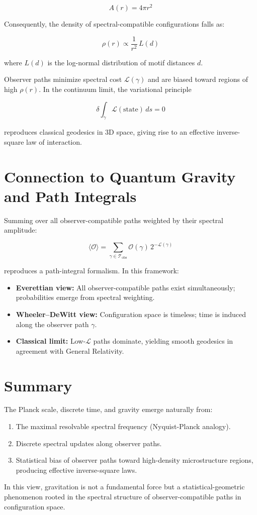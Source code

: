 \documentclass[11pt]{article}
\begin{document}
\[
A(r) = 4 \pi r^2
\]

Consequently, the density of spectral-compatible configurations falls as:

\[
\rho(r) \propto \frac{1}{r^2} \, L(d)
\]

where \(L(d)\) is the log-normal distribution of motif distances \(d\).  

Observer paths minimize spectral cost \(\mathcal{L}(\gamma)\) and are biased toward regions of high \(\rho(r)\). In the continuum limit, the variational principle

\[
\delta \int_\gamma \mathcal{L}(\text{state}) \, ds = 0
\]

reproduces classical geodesics in 3D space, giving rise to an effective inverse-square law of interaction.  

\section{Connection to Quantum Gravity and Path Integrals}  
Summing over all observer-compatible paths weighted by their spectral amplitude:

\[
\langle \mathcal{O} \rangle = \sum_{\gamma \in \mathcal{T}_{\mathrm{obs}}} \mathcal{O}(\gamma) \, 2^{-\mathcal{L}(\gamma)}
\]

reproduces a path-integral formalism. In this framework:

\begin{itemize}
    \item \textbf{Everettian view:} All observer-compatible paths exist simultaneously; probabilities emerge from spectral weighting.  
    \item \textbf{Wheeler–DeWitt view:} Configuration space is timeless; time is induced along the observer path \(\gamma\).  
    \item \textbf{Classical limit:} Low-\(\mathcal{L}\) paths dominate, yielding smooth geodesics in agreement with General Relativity.
\end{itemize}

\section{Summary}  
The Planck scale, discrete time, and gravity emerge naturally from:

\begin{enumerate}
    \item The maximal resolvable spectral frequency (Nyquist-Planck analogy).  
    \item Discrete spectral updates along observer paths.  
    \item Statistical bias of observer paths toward high-density microstructure regions, producing effective inverse-square laws.  
\end{enumerate}

In this view, gravitation is not a fundamental force but a statistical-geometric phenomenon rooted in the spectral structure of observer-compatible paths in configuration space.

\printbibliography
\end{document}
